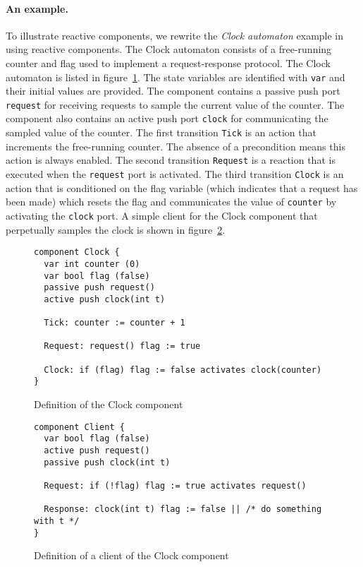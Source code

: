 \paragraph{An example.}
To illustrate reactive components, we rewrite the \emph{Clock automaton} example in ~\cite{nancy1996distributed} using reactive components.
The Clock automaton consists of a free-running counter and flag used to implement a request-response protocol.
The Clock automaton is listed in figure~\ref{clock_component}.
The state variables are identified with \verb+var+ and their initial values are provided.
The component contains a passive push port \verb+request+ for receiving requests to sample the current value of the counter.
The component also contains an active push port \verb+clock+ for communicating the sampled value of the counter.
The first transition \verb+Tick+ is an action that increments the free-running counter.
The absence of a precondition means this action is always enabled.
The second transition \verb+Request+ is a reaction that is executed when the \verb+request+ port is activated.
The third transition \verb+Clock+ is an action that is conditioned on the flag variable (which indicates that a request has been made) which resets the flag and communicates the value of \verb+counter+ by activating the \verb+clock+ port.
A simple client for the Clock component that perpetually samples the clock is shown in figure~\ref{client_component}.

\begin{figure}
\begin{verbatim}
component Clock {
  var int counter (0)
  var bool flag (false)
  passive push request()
  active push clock(int t)

  Tick: counter := counter + 1

  Request: request() flag := true

  Clock: if (flag) flag := false activates clock(counter)
}
\end{verbatim}
\caption{Definition of the Clock component\label{clock_component}}
\end{figure}

\begin{figure}
\begin{verbatim}
component Client {
  var bool flag (false)
  active push request()
  passive push clock(int t)

  Request: if (!flag) flag := true activates request()

  Response: clock(int t) flag := false || /* do something with t */
}
\end{verbatim}
\caption{Definition of a client of the Clock component\label{client_component}}
\end{figure}

